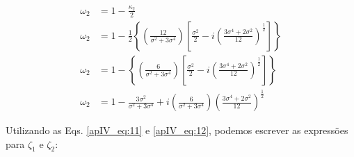 


\begin{align}
\label{apV_eq:27}
\omega_{2} & = 1 - \frac{\kappa_{2}}{2} \\
\label{apV_eq:28}
\omega_{2} & = 1 - \frac{1}{2} \left\lbrace \left( \frac{12}{\sigma^{2} + 3\sigma^{4}} \right) \left[ \frac{\sigma^{2}}{2} - i \left( \frac{3\sigma^{4} + 2\sigma^2}{12} \right)^\frac{1}{2} \right] \right\rbrace \\
\label{apV_eq:29}
\omega_{2} & = 1 - \left\lbrace \left( \frac{6}{\sigma^{2} + 3\sigma^{4}} \right) \left[  \frac{\sigma^{2}}{2} - i \left( \frac{3\sigma^{4} + 2\sigma^2}{12} \right)^\frac{1}{2} \right] \right\rbrace \\
\label{apV_eq:30}
\omega_{2} & = 1 - \frac{3\sigma^{2}}{\sigma^{2} + 3\sigma^{4}} + i \left( \frac{6}{\sigma^{2}+3\sigma^{4}} \right) \left( \frac{3\sigma^{4} + 2\sigma^2}{12} \right)^\frac{1}{2}
\end{align}

Utilizando as Eqs. \ref{apIV_eq:11} e \ref{apIV_eq:12}, podemos escrever as expressões para $\zeta_{1}$ e $\zeta_{2}$:



